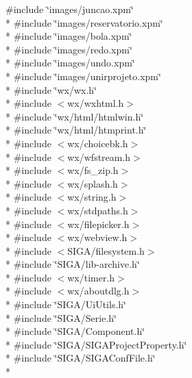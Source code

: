 {\ttfamily \#include \char`\"{}images/juncao.\+xpm\char`\"{}}\\*
{\ttfamily \#include \char`\"{}images/reservatorio.\+xpm\char`\"{}}\\*
{\ttfamily \#include \char`\"{}images/bola.\+xpm\char`\"{}}\\*
{\ttfamily \#include \char`\"{}images/redo.\+xpm\char`\"{}}\\*
{\ttfamily \#include \char`\"{}images/undo.\+xpm\char`\"{}}\\*
{\ttfamily \#include \char`\"{}images/unirprojeto.\+xpm\char`\"{}}\\*
{\ttfamily \#include \char`\"{}wx/wx.\+h\char`\"{}}\\*
{\ttfamily \#include $<$wx/wxhtml.\+h$>$}\\*
{\ttfamily \#include \char`\"{}wx/html/htmlwin.\+h\char`\"{}}\\*
{\ttfamily \#include \char`\"{}wx/html/htmprint.\+h\char`\"{}}\\*
{\ttfamily \#include $<$wx/choicebk.\+h$>$}\\*
{\ttfamily \#include $<$wx/wfstream.\+h$>$}\\*
{\ttfamily \#include $<$wx/fs\+\_\+zip.\+h$>$}\\*
{\ttfamily \#include $<$wx/splash.\+h$>$}\\*
{\ttfamily \#include $<$wx/string.\+h$>$}\\*
{\ttfamily \#include $<$wx/stdpaths.\+h$>$}\\*
{\ttfamily \#include $<$wx/filepicker.\+h$>$}\\*
{\ttfamily \#include $<$wx/webview.\+h$>$}\\*
{\ttfamily \#include $<$S\+I\+G\+A/filesystem.\+h$>$}\\*
{\ttfamily \#include \char`\"{}S\+I\+G\+A/lib-\/archive.\+h\char`\"{}}\\*
{\ttfamily \#include $<$wx/timer.\+h$>$}\\*
{\ttfamily \#include $<$wx/aboutdlg.\+h$>$}\\*
{\ttfamily \#include \char`\"{}S\+I\+G\+A/\+Ui\+Utils.\+h\char`\"{}}\\*
{\ttfamily \#include \char`\"{}S\+I\+G\+A/\+Serie.\+h\char`\"{}}\\*
{\ttfamily \#include \char`\"{}S\+I\+G\+A/\+Component.\+h\char`\"{}}\\*
{\ttfamily \#include \char`\"{}S\+I\+G\+A/\+S\+I\+G\+A\+Project\+Property.\+h\char`\"{}}\\*
{\ttfamily \#include \char`\"{}S\+I\+G\+A/\+S\+I\+G\+A\+Conf\+File.\+h\char`\"{}}\\*
